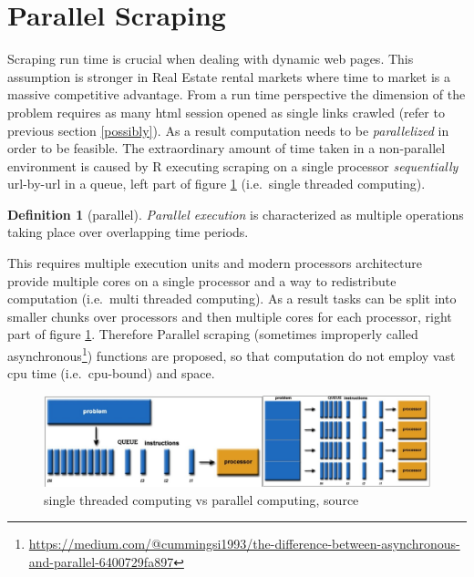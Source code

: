 \documentclass[
  12pt,
  a4paper,
  oneside]{book}
\DeclareRobustCommand{\href}[2]{#2\footnote{\url{#1}}}
\theoremstyle{definition}
\newtheorem{definition}{Definition}[chapter]
\theoremstyle{definition}
\theoremstyle{definition}
\theoremstyle{remark}
\begin{document}
\hypertarget{parallelscraping}{%
\section{Parallel Scraping}\label{parallelscraping}}

Scraping run time is crucial when dealing with dynamic web pages. This assumption is stronger in Real Estate rental markets where time to market is a massive competitive advantage.
From a run time perspective the dimension of the problem requires as many html session opened as single links crawled (refer to previous section \ref{possibly}). As a result computation needs to be \emph{parallelized} in order to be feasible.
The extraordinary amount of time taken in a non-parallel environment is caused by R executing scraping on a single processor \emph{sequentially} url-by-url in a queue, left part of figure \ref{fig:singlethreaded} (i.e.~single threaded computing).

\begin{definition}[parallel]
\protect\hypertarget{def:parallel}{}{\label{def:parallel} {} }\emph{Parallel execution} is characterized as multiple operations taking place over overlapping time periods. \citep{eddelbuettel2020parallel}
\end{definition}

This requires multiple execution units and modern processors architecture provide multiple cores on a single processor and a way to redistribute computation (i.e.~multi threaded computing). As a result tasks can be split into smaller chunks over processors and then multiple cores for each processor, right part of figure \ref{fig:singlethreaded}.
Therefore Parallel scraping (sometimes improperly called \href{https://medium.com/@cummingsi1993/the-difference-between-asynchronous-and-parallel-6400729fa897}{asynchronous}) functions are proposed, so that computation do not employ vast cpu time (i.e.~cpu-bound) and space.

\begin{figure}
\centering
\includegraphics{images/parallel_problem.jpg}
\caption{\label{fig:singlethreaded}single threaded computing vs parallel computing, \citet{barney} source}
\end{figure}
\end{document}
